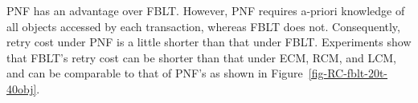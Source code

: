\documentclass[conference]{IEEEtran}
\begin{document}
%
PNF has an advantage over FBLT. However, PNF requires a-priori knowledge of all objects accessed by each transaction, whereas FBLT does not. Consequently, retry cost under PNF is a little shorter than that under FBLT. 
Experiments show that FBLT's retry cost can be shorter than that under ECM, RCM, and LCM, and can be comparable to that of PNF's as shown in Figure~\ref{fig-RC-fblt-20t-40obj}. 
%
\begin{comment}
\begin{figure}
\centering
\texttt{[image: /e/lectures/real-time/PhD-work/STM/Practical/results\_uno/figures/4\_tasks/Abr\_Dur/fblt/Abr\_dur\_4t\_50obj\_100wr\_-1eta]}
\caption{Avgerage retry cost (20 shared objects, 4 tasks).}
\label{fig-RC-fblt-4t-20obj}%
\end{figure}
%
\begin{figure}
\centering
\texttt{[image: /e/lectures/real-time/PhD-work/STM/Practical/results\_uno/figures/4\_tasks/Abr\_Dur/fblt/Abr\_dur\_4t\_100obj\_100wr\_-1eta]}
\caption{Avgerage retry cost (40 shared objects, 4 tasks).}
\label{fig-RC-fblt-4t-40obj}
\end{figure}
%
\begin{figure}
\centering
\texttt{[image: /e/lectures/real-time/PhD-work/STM/Practical/results\_uno/figures/8\_tasks/Abr\_Dur/fblt/Abr\_dur\_8t\_90obj\_100wr\_-1eta]}
\caption{Avgerage retry cost (20 shared objects, 8 tasks).}
\label{fig-RC-fblt-8t-20obj}
\end{figure}

\begin{figure}
\centering
\texttt{[image: /e/lectures/real-time/PhD-work/STM/Practical/results\_uno/figures/8\_tasks/Abr\_Dur/fblt/Abr\_dur\_8t\_180obj\_100wr\_-1eta]}
\caption{Avgerage retry cost (40 shared objects, 8 tasks).}
\label{fig-RC-fblt-8t-40obj}
\end{figure}

\begin{figure}
\centering
\texttt{[image: /e/lectures/real-time/PhD-work/STM/Practical/results\_uno/figures/20\_tasks/Abr\_Dur/fblt/Abr\_dur\_20t\_210obj\_100wr\_-1eta]}
\caption{Avgerage retry cost (20 shared objects, 20 tasks).}
\label{fig-RC-fblt-20t-20obj}
\end{figure}
\end{comment}
\end{document}
